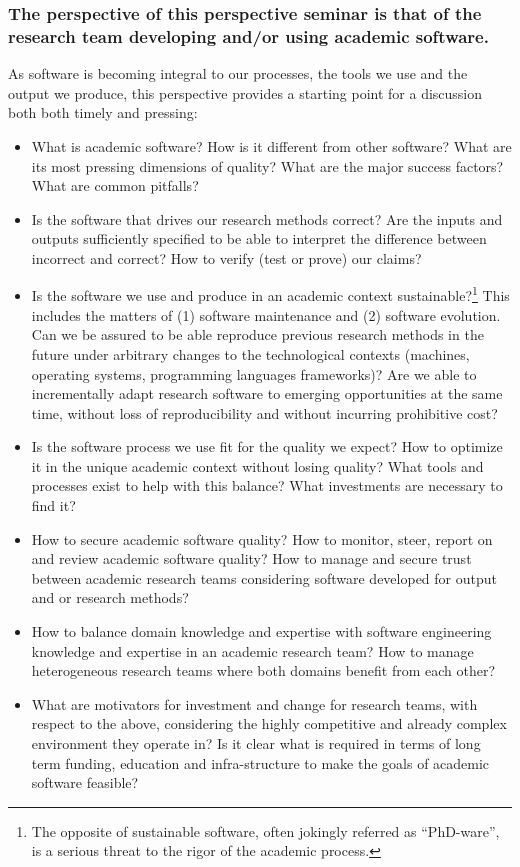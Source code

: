 \documentclass[a4paper,UKenglish]{dagman}
\renewcommand{\paragraph}[1]{\subsubsection*{#1}\xspace}
\begin{document}
\paragraph{The perspective of this perspective seminar is that of the research team developing and/or using academic software.} As software is becoming integral to our processes, the tools we use and the output we produce, this perspective provides a starting point for a discussion both both timely and pressing:

\begin{itemize}
\item What is academic software? How is it different from other software? What are its most pressing dimensions of quality? What are the major success factors? What are common pitfalls?
\item Is the software that drives our research methods correct? Are the inputs and outputs sufficiently specified to be able to interpret the difference between incorrect and correct? How to verify (test or prove) our claims?
\item Is the software we use and produce in an academic context sustainable?\footnote{The opposite of sustainable software, often jokingly referred as ``PhD-ware'', is a serious threat to the rigor of the academic process.} This includes the matters of (1) software maintenance and (2) software evolution. Can we be assured to be able reproduce previous research methods in the future under arbitrary changes to the technological contexts (machines, operating systems, programming languages frameworks)? Are we able to incrementally adapt research software to emerging opportunities at the same time, without loss of reproducibility and without incurring prohibitive cost?
\item Is the software process we use fit for the quality we expect? How to optimize it in the unique academic context without losing quality? What tools and processes exist to help with this balance? What investments are necessary to find it?
\item How to secure academic software quality? How to monitor, steer, report on and review academic software quality? How to manage and secure trust between academic research teams considering software developed for output and or research methods?
\item How to balance domain knowledge and expertise with software engineering knowledge and expertise in an academic research team? How to manage heterogeneous research teams where both domains benefit from each other?   
\item What are motivators for investment and change for research teams, with respect to the above, considering the highly competitive and already complex environment they operate in? Is it clear what is required in terms of long term funding, education and infra-structure to make the goals of academic software feasible?
\end{itemize}
\end{document}
